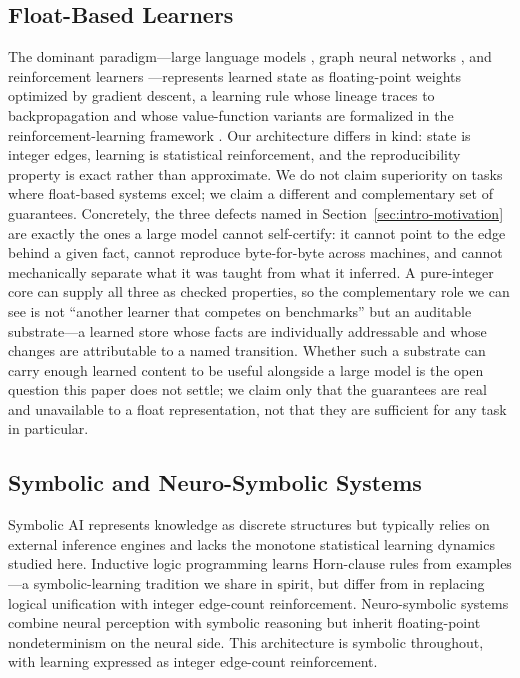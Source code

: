 \documentclass[11pt,a4paper]{article}
\begin{document}
\subsection{Float-Based Learners}
The dominant paradigm---large language models \citep{vaswani2017attention},
graph neural networks \citep{gilmer2017neural}, and reinforcement learners
\citep{mnih2015human}---represents learned state as floating-point
weights optimized by gradient descent, a learning rule whose lineage
traces to backpropagation \citep{rumelhart1986learning} and whose
value-function variants are formalized in the reinforcement-learning
framework \citep{sutton2018rl}. Our architecture differs in kind:
state is integer edges, learning is statistical reinforcement, and the
reproducibility property is exact rather than approximate. We do not
claim superiority on tasks where float-based systems excel; we claim a
different and complementary set of guarantees. Concretely, the three
defects named in Section~\ref{sec:intro-motivation} are exactly the ones
a large model cannot self-certify: it cannot point to the edge behind a
given fact, cannot reproduce byte-for-byte across machines, and cannot
mechanically separate what it was taught from what it inferred. A
pure-integer core can supply all three as checked properties, so the
complementary role we can see is not ``another learner that competes on
benchmarks'' but an auditable substrate---a learned store whose facts
are individually addressable and whose changes are attributable to a
named transition. Whether such a substrate can carry enough learned
content to be useful alongside a large model is the open question this
paper does not settle; we claim only that the guarantees are real and
unavailable to a float representation, not that they are sufficient for
any task in particular.

\subsection{Symbolic and Neuro-Symbolic Systems}
Symbolic AI \citep{russell2010artificial} represents knowledge as discrete
structures but typically relies on external inference engines and lacks
the monotone statistical learning dynamics studied here. Inductive logic
programming \citep{muggleton1991ilp} learns Horn-clause rules from
examples---a symbolic-learning tradition we share in spirit, but differ
from in replacing logical unification with integer edge-count
reinforcement. Neuro-symbolic systems \citep{garcez2020neurosymbolic}
combine neural perception with symbolic reasoning but inherit
floating-point nondeterminism on the neural side. This architecture is
symbolic throughout, with learning expressed as integer edge-count
reinforcement.
\end{document}
